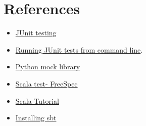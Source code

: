 \documentclass[12pt]{article}
\begin{document}
\section{References}
\begin{itemize}
  \item \href{https://junit.org/junit5/}{JUnit testing}
  \item \href{https://www.lambdatest.com/blog/run-junit-from-command-line/}{Running JUnit tests from command line}.
  \item \href{https://docs.python.org/3/library/unittest.mock.html#:~:text=mock%20is%20a%20library%20for,stubs%20throughout%20your%20test%20suite.}{Python mock library}
  \item \href{https://www.scalatest.org/at_a_glance/FreeSpec}{Scala test- FreeSpec}
  \item \href{https://docs.scala-lang.org/tour/classes.html}{Scala Tutorial}
  \item \href{https://docs.scala-lang.org/tour/classes.html}{Installing sbt}
\end{itemize}
\end{document}
